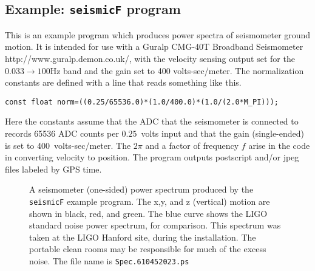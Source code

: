 \subsection{Example: {\tt seismicF} program}

This is an example program which produces power spectra of seismometer
ground motion.  It is intended for use with a Guralp CMG-40T Broadband
Seismometer 
{http://www.guralp.demon.co.uk/}, with the velocity sensing output set for the $0.033\rightarrow100$Hz band and the gain set to 400 volts-sec/meter.
The normalization constants are defined with a line that reads
something like this.
\begin{verbatim}
const float norm=((0.25/65536.0)*(1.0/400.0)*(1.0/(2.0*M_PI)));
\end{verbatim}
Here the constants assume that the ADC that the seismometer is connected to
records 65536 ADC counts per $0.25$~volts input and that
the gain (single-ended) is set to 400~volts-sec/meter. The $2\pi$ and a
factor of frequency $f$ arise in the code in converting velocity to position.
The program outputs postscript and/or jpeg files labeled by GPS time.
\begin{figure}[h]
\begin{center}
\caption{ \label{f:seismicF} \small
A seismometer (one-sided) power spectrum produced by the {\tt seismicF}
example program.  The x,y, and z (vertical) motion are shown in
black, red, and green.  The blue curve shows the LIGO standard noise
power spectrum, for comparison.  This spectrum was taken at the LIGO
Hanford site, during the installation.  The portable clean rooms
may be responsible for much of the excess noise.  The file name
is {\tt Spec.610452023.ps}}
\end{center}
\end{figure}



